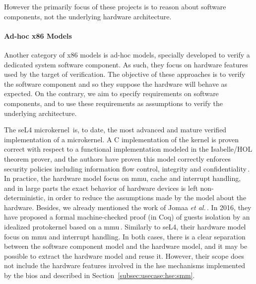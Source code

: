 However the primarily focus of these projects is to reason about software
components, not the underlying hardware architecture.

\paragraph{Ad-hoc x86 Models}
%
Another category of x86 models is ad-hoc models, specially developed to verify a
dedicated system software component.
%
As such, they focus on hardware features used by the target of verification.
%
The objective of these approaches is to verify the software component and so
they suppose the hardware will behave as expected.
%
On the contrary, we aim to specify requirements on software components, and to
use these requirements as assumptions to verify the underlying architecture.

The seL4 microkernel\,\cite{sel4website} is, to date, the most advanced and
mature verified implementation of a microkernel.
%
A C implementation of the kernel is proven correct with respect to a functional
implementation modeled in the Isabelle/HOL theorem prover, and the authors have
proven this model correctly enforces security policies including information
flow control, integrity and confidentiality\,\cite{klein2009sel4}.
%
In practice, the hardware model focus on \ac{mmu}, cache and interrupt handling,
and in large parts the exact behavior of hardware devices is left
non-deterministic, in order to reduce the assumptions made by the model about
the hardware.
%
Besides, we already mentioned the work of Jomaa \emph{et
  al.}\,\cite{jomaa2016mmu}.
%
In 2016, they have proposed a formal machine-checked proof (in Coq) of guests
isolation by an idealized protokernel based on a \ac{mmu}\,\cite{jomaa2016mmu}.
%
Similarly to seL4, their hardware model focus on \ac{mmu} and interrupt
handling.
%
In both cases, there is a clear separation between the software component model
and the hardware model, and it may be possible to extract the hardware model and
reuse it.
%
However, their scope does not include the hardware features involved in the
\ac{hse} mechanisms implemented by the \ac{bios} and described in
Section~\ref{subsec:usecase:hse:smm}.

